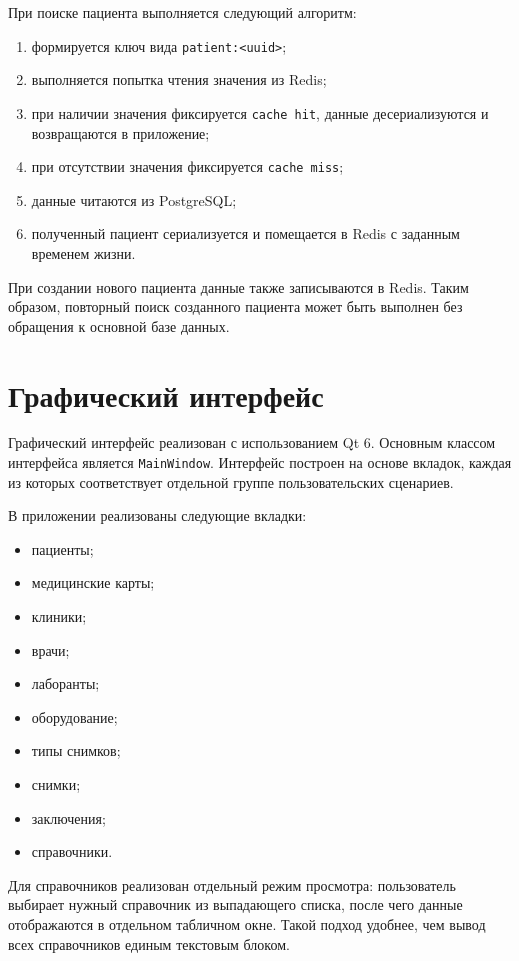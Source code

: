 При поиске пациента выполняется следующий алгоритм:

\begin{enumerate}
	\item формируется ключ вида \texttt{patient:<uuid>};
	\item выполняется попытка чтения значения из Redis;
	\item при наличии значения фиксируется \texttt{cache hit}, данные десериализуются и возвращаются в приложение;
	\item при отсутствии значения фиксируется \texttt{cache miss};
	\item данные читаются из PostgreSQL;
	\item полученный пациент сериализуется и помещается в Redis с заданным временем жизни.
\end{enumerate}

При создании нового пациента данные также записываются в Redis. Таким образом, повторный поиск созданного пациента может быть выполнен без обращения к основной базе данных.

\section{Графический интерфейс}

Графический интерфейс реализован с использованием Qt 6. Основным классом интерфейса является \texttt{MainWindow}. Интерфейс построен на основе вкладок, каждая из которых соответствует отдельной группе пользовательских сценариев.

В приложении реализованы следующие вкладки:

\begin{itemize}
	\item пациенты;
	\item медицинские карты;
	\item клиники;
	\item врачи;
	\item лаборанты;
	\item оборудование;
	\item типы снимков;
	\item снимки;
	\item заключения;
	\item справочники.
\end{itemize}

Для справочников реализован отдельный режим просмотра: пользователь выбирает нужный справочник из выпадающего списка, после чего данные отображаются в отдельном табличном окне. Такой подход удобнее, чем вывод всех справочников единым текстовым блоком.

